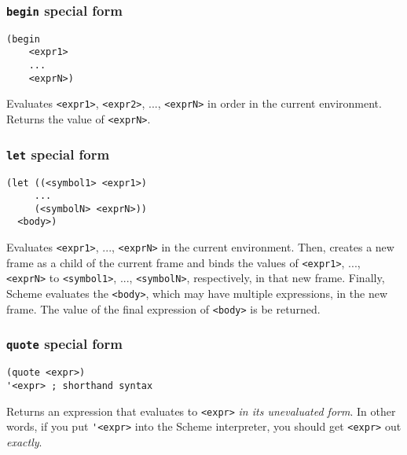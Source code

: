 \subsubsection{\lstinline{begin} special form}
\begin{lstlisting}
(begin 
    <expr1>
    ... 
    <exprN>) 
\end{lstlisting}
Evaluates \lstinline{<expr1>}, \lstinline{<expr2>}, ..., \lstinline{<exprN>} in order in the current environment. Returns the value of \lstinline{<exprN>}. 

\subsubsection{\lstinline{let} special form}
\begin{lstlisting}
(let ((<symbol1> <expr1>) 
     ... 
     (<symbolN> <exprN>)) 
  <body>) 
\end{lstlisting}
Evaluates \lstinline{<expr1>}, ..., \lstinline{<exprN>} in the current environment. Then, creates a new frame as a child of the current frame and binds the values of \lstinline{<expr1>}, ..., \lstinline{<exprN>} to \lstinline{<symbol1>}, ..., \lstinline{<symbolN>}, respectively, in that new frame. Finally, Scheme evaluates the \lstinline{<body>}, which may have multiple expressions, in the new frame. The value of the final expression of \lstinline{<body>} is be returned. 

\subsubsection{\lstinline{quote} special form}
\begin{lstlisting}
(quote <expr>)
'<expr> ; shorthand syntax
\end{lstlisting}
Returns an expression that evaluates to \lstinline{<expr>} \textit{in its unevaluated form}. In other words, if you put \lstinline{'<expr>} into the Scheme interpreter, you should get \lstinline{<expr>} out \textit{exactly}. 


